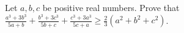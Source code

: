 Let $a,b,c$ be positive real numbers. Prove that $\frac{a^3+3b^3}{5a+b}+\frac{b^3+3c^3}{5b+c}+\frac{c^3+3a^3}{5c+a} \geq \frac{2}{3}(a^2+b^2+c^2)$.